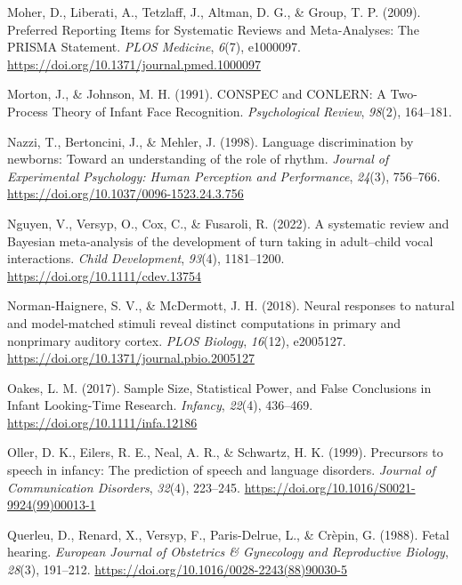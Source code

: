 \documentclass[
  man,mask,floatsintext]{apa6}
\newlength{\cslhangindent}
\newlength{\cslentryspacingunit} %
\newenvironment{CSLReferences}[2] %
 {%
  \setlength{\parindent}{0pt}
  \ifodd #1
  \let\oldpar\par
  \def\par{\hangindent=\cslhangindent\oldpar}
  \fi
  \setlength{\parskip}{#2\cslentryspacingunit}
 }%
 {}
\begin{document}
\begin{CSLReferences}{1}{0}
\leavevmode{}%
Moher, D., Liberati, A., Tetzlaff, J., Altman, D. G., \& Group, T. P. (2009). Preferred {Reporting} {Items} for {Systematic} {Reviews} and {Meta}-{Analyses}: {The} {PRISMA} {Statement}. \emph{PLOS Medicine}, \emph{6}(7), e1000097. \url{https://doi.org/10.1371/journal.pmed.1000097}

\leavevmode{}%
Morton, J., \& Johnson, M. H. (1991). {CONSPEC} and {CONLERN}: {A} {Two}-{Process} {Theory} of {Infant} {Face} {Recognition}. \emph{Psychological Review}, \emph{98}(2), 164--181.

\leavevmode{}%
Nazzi, T., Bertoncini, J., \& Mehler, J. (1998). Language discrimination by newborns: {Toward} an understanding of the role of rhythm. \emph{Journal of Experimental Psychology: Human Perception and Performance}, \emph{24}(3), 756--766. \url{https://doi.org/10.1037/0096-1523.24.3.756}

\leavevmode{}%
Nguyen, V., Versyp, O., Cox, C., \& Fusaroli, R. (2022). A systematic review and {Bayesian} meta-analysis of the development of turn taking in adult--child vocal interactions. \emph{Child Development}, \emph{93}(4), 1181--1200. \url{https://doi.org/10.1111/cdev.13754}

\leavevmode{}%
Norman-Haignere, S. V., \& McDermott, J. H. (2018). Neural responses to natural and model-matched stimuli reveal distinct computations in primary and nonprimary auditory cortex. \emph{PLOS Biology}, \emph{16}(12), e2005127. \url{https://doi.org/10.1371/journal.pbio.2005127}

\leavevmode{}%
Oakes, L. M. (2017). Sample {Size}, {Statistical} {Power}, and {False} {Conclusions} in {Infant} {Looking}-{Time} {Research}. \emph{Infancy}, \emph{22}(4), 436--469. \url{https://doi.org/10.1111/infa.12186}

\leavevmode{}%
Oller, D. K., Eilers, R. E., Neal, A. R., \& Schwartz, H. K. (1999). Precursors to speech in infancy: {The} prediction of speech and language disorders. \emph{Journal of Communication Disorders}, \emph{32}(4), 223--245. \url{https://doi.org/10.1016/S0021-9924(99)00013-1}

\leavevmode{}%
Querleu, D., Renard, X., Versyp, F., Paris-Delrue, L., \& Crèpin, G. (1988). Fetal hearing. \emph{European Journal of Obstetrics \& Gynecology and Reproductive Biology}, \emph{28}(3), 191--212. \url{https://doi.org/10.1016/0028-2243(88)90030-5}


\end{CSLReferences}
\end{document}
